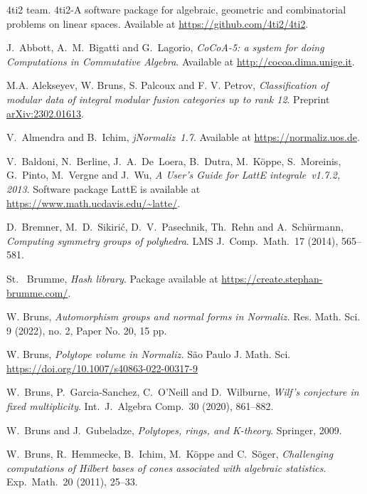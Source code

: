 \documentclass[12pt,a4paper]{scrartcl}
\theoremstyle{definition}
\begin{document}
\begin{thebibliography}{15.}
\small

4ti2 team. 4ti2-A software package
for algebraic, geometric and combinatorial problems on linear
spaces. Available at \url{https://github.com/4ti2/4ti2}.

J.~Abbott, A.~M.~Bigatti and G.~Lagorio,
\emph{CoCoA-5: a system for doing Computations in Commutative Algebra}.
Available at \url{http://cocoa.dima.unige.it}.

M.A. Alekseyev, W. Bruns, S. Palcoux and F. V. Petrov, \emph{Classification of modular data of integral modular fusion categories up to rank 12}. Preprint \url{arXiv:2302.01613}.

V.~Almendra and B.~Ichim,
\emph{jNormaliz~1.7}.
Available at \url{https://normaliz.uos.de}.

V.~Baldoni, N.~Berline, J.~A.~De~Loera, B.~Dutra,
M.~K\"oppe, S.~Moreinis, G.~Pinto, M.~Vergne and J.~Wu,
\emph{A User's Guide for LattE integrale~v1.7.2, 2013}.
Software package LattE is available at \url{https://www.math.ucdavis.edu/~latte/}.

D.~Bremner, M.~D.~Sikiri\'c, D.~V.~Pasechnik, Th.~Rehn and A.~Sch\"urmann,
\emph{Computing symmetry groups of polyhedra}.
LMS J.\ Comp.\ Math.\ 17 (2014), 565--581.

St.~ Brumme,
\emph{Hash library}.
Package available at \url{https://create.stephan-brumme.com/}.

W. Bruns, \emph{Automorphism groups and normal forms in Normaliz.} Res. Math. Sci. 9 (2022), no. 2, Paper No. 20, 15 pp.

W. Bruns, \emph{Polytope volume in Normaliz.}
São Paulo J. Math. Sci.
\url{https://doi.org/10.1007/s40863-022-00317-9}

W.~Bruns, P.~Garcia-Sanchez, C.~O'Neill and D.~Wilburne,
\emph{Wilf's conjecture in fixed multiplicity}.
Int.\ J.\ Algebra Comp.\ 30 (2020), 861--882.

W.~Bruns and J.~Gubeladze,
\emph{Polytopes, rings, and K-theory}.
Springer, 2009.

W.~Bruns, R.~Hemmecke, B.~Ichim, M.~K\"oppe and C.~S\"oger,
\emph{Challenging computations of Hilbert bases of cones associated with algebraic statistics}.
Exp.\ Math.\ 20 (2011), 25--33.


\end{thebibliography}
\end{document}
